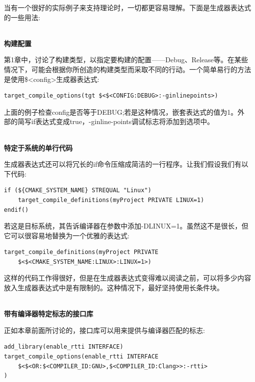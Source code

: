 
当有一个很好的实际例子来支持理论时，一切都更容易理解。下面是生成器表达式的一些用法:

\hspace*{\fill} \\ %
\noindent
\textbf{构建配置}

第1章中，讨论了构建类型，以指定要构建的配置——Debug、Release等。在某些情况下，可能会根据你所创造的构建类型而采取不同的行动。一个简单易行的方法是使用\$<config>生成器表达式:

\begin{lstlisting}[style=styleCMake]
target_compile_options(tgt $<$<CONFIG:DEBUG>:-ginlinepoints>)
\end{lstlisting}

上面的例子检查config是否等于DEBUG;若是这种情况，嵌套表达式的值为1。外部的简写if表达式变成true，-ginline-points调试标志将添加到选项中。

\hspace*{\fill} \\ %
\noindent
\textbf{特定于系统的单行代码}

生成器表达式还可以将冗长的if命令压缩成简洁的一行程序。让我们假设我们有以下代码:

\begin{lstlisting}[style=styleCMake]
if (${CMAKE_SYSTEM_NAME} STREQUAL "Linux")
	target_compile_definitions(myProject PRIVATE LINUX=1)
endif()
\end{lstlisting}

若这是目标系统，其告诉编译器在参数中添加-DLINUX=1。虽然这不是很长，但它可以很容易地替换为一个优雅的表达式:

\begin{lstlisting}[style=styleCMake]
target_compile_definitions(myProject PRIVATE
	$<$<CMAKE_SYSTEM_NAME:LINUX>:LINUX=1>)
\end{lstlisting}

这样的代码工作得很好，但是在生成器表达式变得难以阅读之前，可以将多少内容放入生成器表达式中是有限制的。这种情况下，最好坚持使用长条件块。

\hspace*{\fill} \\ %
\noindent
\textbf{带有编译器特定标志的接口库}

正如本章前面所讨论的，接口库可以用来提供与编译器匹配的标志:

\begin{lstlisting}[style=styleCMake]
add_library(enable_rtti INTERFACE)
target_compile_options(enable_rtti INTERFACE
	$<$<OR:$<COMPILER_ID:GNU>,$<COMPILER_ID:Clang>>:-rtti>
)
\end{lstlisting}

